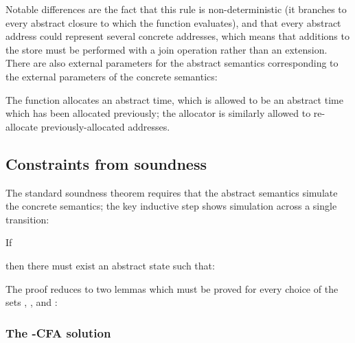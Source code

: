 Notable differences are the fact that this rule is non-deterministic
(it branches to every abstract closure to which the function 
evaluates), and that every abstract address could represent several
concrete addresses, which means that additions to the store must be
performed with a join operation  rather than an extension.
There are also external parameters for the abstract semantics
corresponding to the external parameters of the concrete semantics:
\begin{small}\end{small}The  function allocates an abstract time, which is allowed to
be an abstract time which has been allocated previously; the allocator
 is similarly allowed to re-allocate previously-allocated addresses.


\subsection{Constraints from soundness}

The standard soundness theorem requires that the abstract semantics
simulate the concrete semantics; the key inductive step shows
simulation across a single transition:
\begin{theorem}
  If 

then there must exist an abstract state  such that:

\end{theorem}
The proof reduces to two lemmas which must be
proved for every choice of the sets , ,
 and :
\begin{lemma}\label{lemma:time-stamp-simulation}

\end{lemma}
\begin{lemma}
\label{lemma:allocator-simulation}

\end{lemma}





\subsubsection{The -CFA solution}

